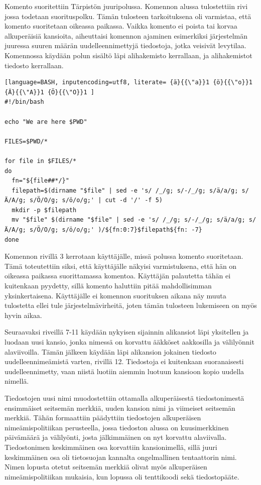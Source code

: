 \documentclass[finnish]{tktltiki}
\begin{document}
Komento suoritettiin Tärpistön juuripolussa. Komennon alussa tulostettiin rivi jossa todetaan suorituspolku. Tämän tulosteen tarkoituksena oli varmistaa, että komento suoritetaan oikeassa paikassa. Vaikka komento ei poista tai korvaa alkuperäisiä kansioita, aiheuttaisi komennon ajaminen esimerkiksi järjestelmän juuressa suuren määrän uudelleennimettyjä tiedostoja, jotka veisivät levytilaa. Komennossa käydään polun sisältö läpi alihakemisto kerrallaan, ja alihakemistot tiedosto kerrallaan.

\begin{lstlisting}[language=BASH, inputencoding=utf8, literate= {ä}{{\"a}}1 {ö}{{\"o}}1  {Ä}{{\"A}}1 {Ö}{{\"O}}1 ]
#!/bin/bash

echo "We are here $PWD"

FILES=$PWD/*

for file in $FILES/*
do
  fn="${file##*/}"
  filepath=$(dirname "$file" | sed -e 's/ /_/g; s/-/_/g; s/ä/a/g; s/Ä/A/g; s/Ö/O/g; s/ö/o/g;' | cut -d '/' -f 5)
  mkdir -p $filepath
  mv "$file" $(dirname "$file" | sed -e 's/ /_/g; s/-/_/g; s/ä/a/g; s/Ä/A/g; s/Ö/O/g; s/ö/o/g;' )/${fn:0:7}$filepath${fn: -7}
done
\end{lstlisting}

Komennon rivillä 3 kerrotaan käyttäjälle, missä polussa komento suoritetaan. Tämä toteutettiin siksi, että käyttäjälle näkyisi varmistuksena, että hän on oikeassa paikassa suorittamassa komentoa. Käyttäjän palautetta tähän ei kuitenkaan pyydetty, sillä komento haluttiin pitää mahdollisimman yksinkertaisena. Käyttäjälle ei komennon suorituksen aikana näy muuta tulostetta ellei tule järjestelmävirheitä, joten tämän tulosteen lukemiseen on myös hyvin aikaa.

Seuraavaksi riveillä 7-11 käydään nykyisen sijainnin alikansiot läpi yksitellen ja luodaan uusi kansio, jonka nimessä on korvattu ääkköset aakkosilla ja välilyönnit alaviivoilla. Tämän jälkeen käydään läpi alikansion jokainen tiedosto uudelleennimeämistä varten, rivillä 12. Tiedostoja ei kuitenkaan suoranaisesti uudelleennimetty, vaan niistä luotiin aiemmin luotuun kansioon kopio uudella nimellä. 

Tiedostojen uusi nimi muodostettiin ottamalla alkuperäisestä tiedostonimestä ensimmäiset seitsemän merkkiä, uuden kansion nimi ja viimeiset seitsemän merkkiä. Tähän formaattiin päädyttiin tiedostojen alkuperäisen nimeämispolitiikan perusteella, jossa tiedoston alussa on kuusimerkkinen päivämäärä ja välilyönti, josta jälkimmäinen on nyt korvattu alaviivalla. Tiedostonimen keskimmäinen osa korvattiin kansionimellä, sillä juuri keskimmäinen osa oli tietosuojan kannalta ongelmallinen tentaattorin nimi. Nimen lopusta otetut seitsemän merkkiä olivat myös alkuperäisen nimeämispolitiikan mukaisia, kun lopussa oli tenttikoodi sekä tiedostopääte.
\end{document}
